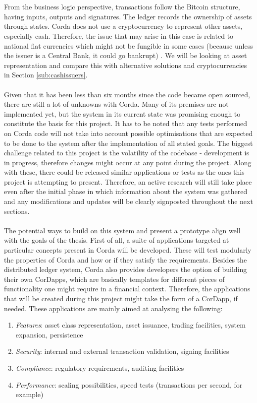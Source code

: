 \documentclass[12pt,twoside]{article}
\begin{document}
\\ \\
From the business logic perspective, transactions follow the Bitcoin structure, having inputs, outputs and signatures. The ledger records the ownership of assets through states. Corda does not use a cryptocurrency to represent other assets, especially cash. Therefore, the issue that may arise in this case is related to national fiat currencies which might not be fungible in some cases (because unless the issuer is a Central Bank, it could go bankrupt) \cite{Corda:TP}. We will be looking at asset representation and compare this with alternative solutions and cryptocurrencies in Section \ref{sub:cashissuers}.
\\ \\
Given that it has been less than six months since the code became open sourced, there are still a lot of unknowns with Corda. Many of its premises are not implemented yet, but the system in its current state was promising enough to constitute the basis for this project. It has to be noted that any tests performed on Corda code will not take into account possible optimisations that are expected to be done to the system after the implementation of all stated goals. The biggest challenge related to this project is the volatility of the codebase - development is in progress, therefore changes might occur at any point during the project. Along with these, there could be released similar applications or tests as the ones this project is attempting to present. Therefore, an active research will still take place even after the initial phase in which information about the system was gathered and any modifications and updates will be clearly signposted throughout the next sections. 
\\ \\
The potential ways to build on this system and present a prototype align well with the goals of the thesis. First of all, a suite of applications targeted at particular concepts present in Corda will be developed. These will test modularly the properties of Corda and how or if they satisfy the requirements. Besides the distributed ledger system, Corda also provides developers the option of building their own CorDapps, which are basically templates for different pieces of functionality one might require in a financial context. Therefore, the applications that will be created during this project might take the form of a CorDapp, if needed. These applications are mainly aimed at analysing the following:
\begin{enumerate}
\item \textit{Features}: asset class representation, asset issuance, trading facilities, system expansion, persistence
\item \textit{Security}: internal and external transaction validation, signing facilities
\item \textit{Compliance}: regulatory requirements, auditing facilities
\item \textit{Performance}: scaling possibilities, speed tests (transactions per second, for example)
\end{enumerate}
\end{document}
